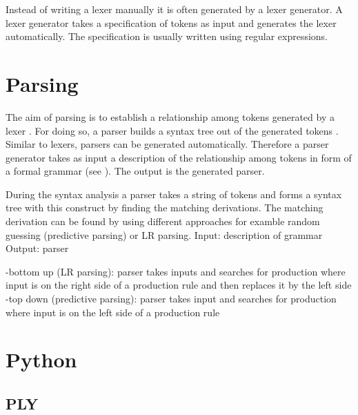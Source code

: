 Instead of writing a lexer manually it is often generated by a lexer generator. A lexer generator takes a specification of tokens as input and generates the lexer automatically. 
The specification is usually written using regular expressions. 





\section{Parsing}\label{sec:BackgroundParser}
The aim of parsing is to establish a relationship among tokens generated by a lexer \cite{LexYacc.1992}. For doing so, a parser builds a syntax tree out of the generated tokens \cite{Mogensen.2017}.\\
Similar to lexers, parsers can be generated automatically.
Therefore a parser generator takes as input a description of the relationship among tokens in form of a formal grammar (see ). The output is the generated parser. \cite{LexYacc.1992}

During the syntax analysis a parser takes a string of tokens and forms a syntax tree with this construct by finding the matching derivations. The matching derivation can be found by using different approaches for examble random guessing (predictive parsing) or LR parsing.
Input: description of grammar \cite{LexYacc.1992}
Output: parser \cite{LexYacc.1992}

-bottom up (LR parsing):
parser takes inputs and searches for production where input is on the right side of a production rule and then replaces it by the left side
-top down (predictive parsing):
parser takes input and searches for production where input is on the left side of a production rule

\section{Python}\label{sec:BackgroundPython}
\subsection{PLY}\label{sec:BackgroundPythonPLY}

